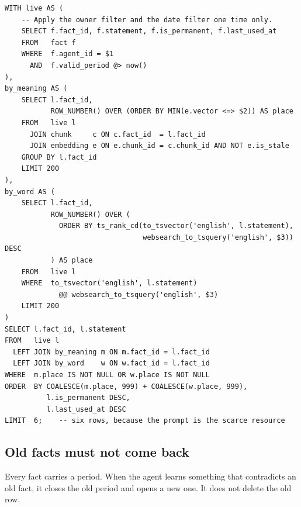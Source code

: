 \documentclass[11pt,a4paper]{article}
\begin{document}
\begin{lstlisting}[style=sql,caption={Recall. The two searches run, the results merge, and the query returns six rows.}]
WITH live AS (
    -- Apply the owner filter and the date filter one time only.
    SELECT f.fact_id, f.statement, f.is_permanent, f.last_used_at
    FROM   fact f
    WHERE  f.agent_id = $1
      AND  f.valid_period @> now()
),
by_meaning AS (
    SELECT l.fact_id,
           ROW_NUMBER() OVER (ORDER BY MIN(e.vector <=> $2)) AS place
    FROM   live l
      JOIN chunk     c ON c.fact_id  = l.fact_id
      JOIN embedding e ON e.chunk_id = c.chunk_id AND NOT e.is_stale
    GROUP BY l.fact_id
    LIMIT 200
),
by_word AS (
    SELECT l.fact_id,
           ROW_NUMBER() OVER (
             ORDER BY ts_rank_cd(to_tsvector('english', l.statement),
                                 websearch_to_tsquery('english', $3)) DESC
           ) AS place
    FROM   live l
    WHERE  to_tsvector('english', l.statement)
             @@ websearch_to_tsquery('english', $3)
    LIMIT 200
)
SELECT l.fact_id, l.statement
FROM   live l
  LEFT JOIN by_meaning m ON m.fact_id = l.fact_id
  LEFT JOIN by_word    w ON w.fact_id = l.fact_id
WHERE  m.place IS NOT NULL OR w.place IS NOT NULL
ORDER  BY COALESCE(m.place, 999) + COALESCE(w.place, 999),
          l.is_permanent DESC,
          l.last_used_at DESC
LIMIT  6;    -- six rows, because the prompt is the scarce resource
\end{lstlisting}

\subsection{Old facts must not come back}
\label{sec:validity}

Every fact carries a period. When the agent learns something that
contradicts an old fact, it closes the old period and opens a new one. It
does not delete the old row.
\end{document}
